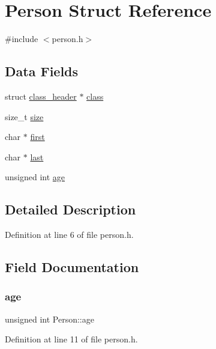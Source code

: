 \hypertarget{structPerson}{}\section{Person Struct Reference}
\label{structPerson}


{\ttfamily \#include $<$person.\+h$>$}

\subsection*{Data Fields}
\begin{DoxyCompactItemize}
\item 
struct \mbox{\hyperlink{structclass__header}{class\+\_\+header}} $\ast$ \mbox{\hyperlink{structPerson_ac2d72607b366d6b5520a340b3deaced4}{class}}
\item 
size\+\_\+t \mbox{\hyperlink{structPerson_afcedcdc3dc5eba7d989eeaa55d236a11}{size}}
\item 
char $\ast$ \mbox{\hyperlink{structPerson_a38f2f16e85640e2f851e46319735dc2a}{first}}
\item 
char $\ast$ \mbox{\hyperlink{structPerson_a680212888ba741ce822803812588fbcf}{last}}
\item 
unsigned int \mbox{\hyperlink{structPerson_a821d801ffc30ff9d5f12c4be38f03aec}{age}}
\end{DoxyCompactItemize}


\subsection{Detailed Description}


Definition at line 6 of file person.\+h.



\subsection{Field Documentation}
\mbox{\label{structPerson_a821d801ffc30ff9d5f12c4be38f03aec}} 
\subsubsection{\texorpdfstring{age}{age}}
{\footnotesize\ttfamily unsigned int Person\+::age}



Definition at line 11 of file person.\+h.

